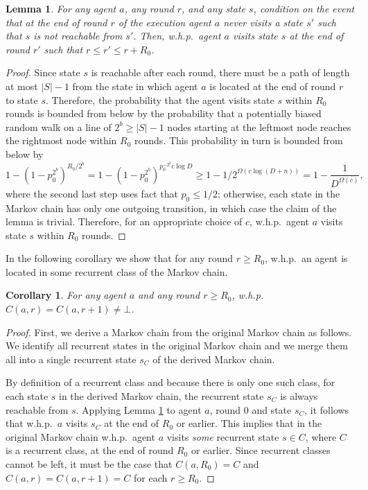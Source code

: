 \documentclass[11pt]{article}
\newtheorem{lemma}[theorem]{Lemma}
\newtheorem{corollary}[theorem]{Corollary}
\begin{document}
\begin{lemma}
\label{lem:reach}
For any agent $a$, any round $r$, and any state $s$, condition on the event that at the end of round $r$ of the execution agent $a$ never visits a state $s'$ such that $s$ is not reachable from $s'$. Then, w.h.p.\ agent $a$ visits state $s$ at the end of round $r'$ such that $r \leq r' \leq r+R_0$.
\end{lemma}
\begin{proof}
	Since state $s$ is reachable after each round, there must be a path of length at most $|S|-1$ from the state in which agent $a$ is located at the end of round $r$ to state $s$. Therefore, the probability that the agent visits state $s$ within $R_0$ rounds is bounded from below by the probability that a potentially biased random walk on a line of $2^b\geq |S|-1$ nodes starting at the leftmost node reaches the rightmost node within $R_0$ rounds. This probability in turn is bounded from below by
\begin{equation*}
1 - \left(1-p_0^{2^b}\right)^{R_0/2^b}=1 - \left(1-p_0^{2^b}\right)^{p_0^{-2^b}c\log D}
\geq 1 - 1/2^{\Omega(c\log(D+n))}=1 - \frac{1}{D^{\Omega(c)}},
\end{equation*}
where the second last step uses fact that $p_0 \leq 1/2$; otherwise, each state in the Markov chain has only one outgoing transition, in which case the claim of the lemma is trivial.
Therefore, for an appropriate choice of $c$, w.h.p.\ agent $a$ visits state $s$ within $R_0$ rounds.
\end{proof}

In the following corollary we show that for any round $r \geq R_0$, w.h.p.\ an agent is located in some recurrent class of the Markov chain.

\begin{corollary}
\label{cor:initial}
	For any agent $a$ and any round $r \geq R_0$, w.h.p.\ $C(a,r) = C(a,r+1) \neq \bot$.
\end{corollary}
\begin{proof}
First, we derive a Markov chain from the original Markov chain as follows. We identify all recurrent states in the original Markov chain and we merge them all into a single recurrent state $s_C$ of the derived Markov chain.

By definition of a recurrent class and because there is only one such class, for each state $s$ in the derived Markov chain, the recurrent state $s_C$ is always reachable from $s$. Applying Lemma \ref{lem:reach} to agent $a$, round $0$ and state $s_C$, it follows that w.h.p.\ $a$ visits $s_C$ at the end of $R_0$ or earlier. This implies that in the original Markov chain w.h.p.\ agent $a$ visits \emph{some} recurrent state $s \in C$, where $C$ is a recurrent class, at the end of round $R_0$ or earlier.
Since recurrent classes cannot be left, it must be the case that $C(a,R_0) = C$ and $C(a,r) = C(a,r+1) = C$ for each $r \geq R_0$.
\end{proof}
\end{document}
